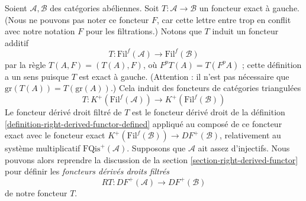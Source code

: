 \noindent
Soient $\mathcal{A}, \mathcal{B}$ des catégories abéliennes.
Soit $T : \mathcal{A} \to \mathcal{B}$ un foncteur exact à gauche.
(Nous ne pouvons pas noter ce foncteur $F$, car cette lettre entre trop en
conflit avec notre notation $F$ pour les filtrations.) Notons que $T$ induit un
foncteur additif
$$
T : \text{Fil}^f(\mathcal{A}) \to \text{Fil}^f(\mathcal{B})
$$
par la règle $T(A, F) = (T(A), F)$, où $F^pT(A) = T(F^pA)$ ; cette définition
a un sens puisque $T$ est exact à gauche. (Attention : il n'est pas
nécessaire que $\text{gr}(T(A)) = T(\text{gr}(A))$.)
Cela induit des foncteurs de catégories triangulées
\begin{equation}
\label{equation-induced-T-filtered}
T :
K^{+}(\text{Fil}^f(\mathcal{A}))
\longrightarrow
K^{+}(\text{Fil}^f(\mathcal{B}))
\end{equation}
Le foncteur dérivé droit filtré de $T$ est le foncteur dérivé droit de la
définition \ref{definition-right-derived-functor-defined} appliqué au composé
de ce foncteur exact avec le foncteur exact
$K^{+}(\text{Fil}^f(\mathcal{B})) \to DF^{+}(\mathcal{B})$, relativement au
système multiplicatif $\text{FQis}^{+}(\mathcal{A})$.
Supposons que $\mathcal{A}$ ait assez d'injectifs. Nous pouvons alors reprendre
la discussion de la section \ref{section-right-derived-functor} pour définir
les {\it foncteurs dérivés droits filtrés}
\begin{equation}
\label{equation-filtered-derived-functor}
RT : DF^{+}(\mathcal{A}) \longrightarrow DF^{+}(\mathcal{B})
\end{equation}
de notre foncteur $T$.

